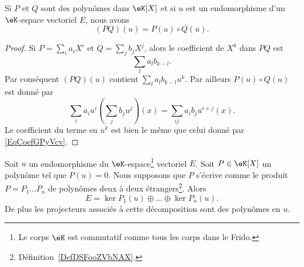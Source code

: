 \begin{lemma}       \label{LemQWvhYb}
    Si \( P\) et \( Q\) sont des polynômes dans \( \eK[X]\) et si \( u\) est un endomorphisme d'un \( \eK\)-espace vectoriel \( E\), nous avons
    \begin{equation}
        (PQ)(u)=P(u)\circ Q(u).
    \end{equation}
\end{lemma}

\begin{proof}
    Si \( P=\sum_i a_iX^i\) et \( Q=\sum_j b_jX^j\), alors le coefficient de \( X^k\) dans \( PQ\) est
    \begin{equation}        \label{EqCoefGPyVcv}
        \sum_la_lb_{k-l}.
    \end{equation}
    Par conséquent \( (PQ)(u)\) contient \( \sum_la_lb_{k-l}u^k\). Par ailleurs \( P(u)\circ Q(u)\) est donné par
    \begin{equation}
        \sum_ia_iu^i\left( \sum_jb_ju^j \right)(x)=\sum_{ij}a_ib_ju^{i+j}(x).
    \end{equation}
    Le coefficient du terme en \( u^k\) est bien le même que celui donné par \eqref{EqCoefGPyVcv}.
\end{proof}

\begin{theorem}       \label{ThoDecompNoyayzzMWod}
    Soit \( u\) un endomorphisme du \( \eK\)-espace\footnote{Le corps \( \eK\) est commutatif comme tous les corps dans le Frido.} vectoriel \( E\). Soit \( P\in\eK[X]\) un polynôme tel que \( P(u)=0\). Nous supposons que \( P\) s'écrive comme le produit \( P=P_1\ldots P_n\) de polynômes deux à deux étrangers\footnote{Définition~\ref{DefDSFooZVbNAX}.}. Alors
    \begin{equation}
        E=\ker P_1(u)\oplus\ldots\oplus\ker P_n(u).
    \end{equation}
    De plus les projecteurs associés à cette décomposition sont des polynômes en \( u\).
\end{theorem}

